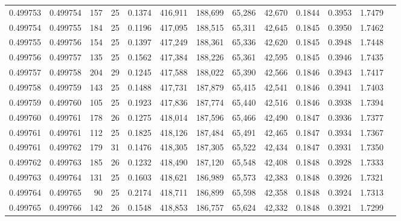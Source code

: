 \begin{tabular}{rrrrrrrrrrrrr}
0.499753 & 0.499754 & 157 &  25 &                                     0.1374 & 416,911 & 188,699 &  65,286 &  42,670 & 0.1844 & 0.3953 & 1.7479 \\
0.499754 & 0.499755 & 184 &  25 &                                     0.1196 & 417,095 & 188,515 &  65,311 &  42,645 & 0.1845 & 0.3950 & 1.7462 \\
0.499755 & 0.499756 & 154 &  25 &                                     0.1397 & 417,249 & 188,361 &  65,336 &  42,620 & 0.1845 & 0.3948 & 1.7448 \\
0.499756 & 0.499757 & 135 &  25 &                                     0.1562 & 417,384 & 188,226 &  65,361 &  42,595 & 0.1845 & 0.3946 & 1.7435 \\
0.499757 & 0.499758 & 204 &  29 &                                     0.1245 & 417,588 & 188,022 &  65,390 &  42,566 & 0.1846 & 0.3943 & 1.7417 \\
0.499758 & 0.499759 & 143 &  25 &                                     0.1488 & 417,731 & 187,879 &  65,415 &  42,541 & 0.1846 & 0.3941 & 1.7403 \\
0.499759 & 0.499760 & 105 &  25 &                                     0.1923 & 417,836 & 187,774 &  65,440 &  42,516 & 0.1846 & 0.3938 & 1.7394 \\
0.499760 & 0.499761 & 178 &  26 &                                     0.1275 & 418,014 & 187,596 &  65,466 &  42,490 & 0.1847 & 0.3936 & 1.7377 \\
0.499761 & 0.499761 & 112 &  25 &                                     0.1825 & 418,126 & 187,484 &  65,491 &  42,465 & 0.1847 & 0.3934 & 1.7367 \\
0.499761 & 0.499762 & 179 &  31 &                                     0.1476 & 418,305 & 187,305 &  65,522 &  42,434 & 0.1847 & 0.3931 & 1.7350 \\
0.499762 & 0.499763 & 185 &  26 &                                     0.1232 & 418,490 & 187,120 &  65,548 &  42,408 & 0.1848 & 0.3928 & 1.7333 \\
0.499763 & 0.499764 & 131 &  25 &                                     0.1603 & 418,621 & 186,989 &  65,573 &  42,383 & 0.1848 & 0.3926 & 1.7321 \\
0.499764 & 0.499765 &  90 &  25 &                                     0.2174 & 418,711 & 186,899 &  65,598 &  42,358 & 0.1848 & 0.3924 & 1.7313 \\
0.499765 & 0.499766 & 142 &  26 &                                     0.1548 & 418,853 & 186,757 &  65,624 &  42,332 & 0.1848 & 0.3921 & 1.7299 \\

\end{tabular}
